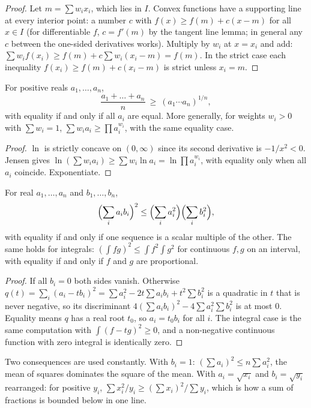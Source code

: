 \begin{proof}
Let $m=\sum w_ix_i$, which lies in $I$. Convex functions have a supporting line at every interior point: a number $c$ with $f(x)\ge f(m)+c(x-m)$ for all $x\in I$ (for differentiable $f$, $c=f'(m)$ by the tangent line lemma; in general any $c$ between the one-sided derivatives works). Multiply by $w_i$ at $x=x_i$ and add: $\sum w_if(x_i)\ge f(m)+c\sum w_i(x_i-m)=f(m)$. In the strict case each inequality $f(x_i)\ge f(m)+c(x_i-m)$ is strict unless $x_i=m$.
\end{proof}

\begin{theorem}
For positive reals $a_1,\dots,a_n$,
\[
\frac{a_1+\dots+a_n}{n}\ \ge\ (a_1\cdots a_n)^{1/n},
\]
with equality if and only if all $a_i$ are equal. More generally, for weights $w_i>0$ with $\sum w_i=1$, $\sum w_ia_i\ge\prod a_i^{w_i}$, with the same equality case.
\end{theorem}

\begin{proof}
$\ln$ is strictly concave on $(0,\infty)$ since its second derivative is $-1/x^2<0$. Jensen gives $\ln(\sum w_ia_i)\ge\sum w_i\ln a_i=\ln\prod a_i^{w_i}$, with equality only when all $a_i$ coincide. Exponentiate.
\end{proof}

\begin{theorem}
For real $a_1,\dots,a_n$ and $b_1,\dots,b_n$,
\[
\Bigl(\sum_i a_ib_i\Bigr)^2\le\Bigl(\sum_i a_i^2\Bigr)\Bigl(\sum_i b_i^2\Bigr),
\]
with equality if and only if one sequence is a scalar multiple of the other. The same holds for integrals: $(\int fg)^2\le\int f^2\int g^2$ for continuous $f,g$ on an interval, with equality if and only if $f$ and $g$ are proportional.
\end{theorem}

\begin{proof}
If all $b_i=0$ both sides vanish. Otherwise $q(t)=\sum_i(a_i-tb_i)^2=\sum a_i^2-2t\sum a_ib_i+t^2\sum b_i^2$ is a quadratic in $t$ that is never negative, so its discriminant $4(\sum a_ib_i)^2-4\sum a_i^2\sum b_i^2$ is at most $0$. Equality means $q$ has a real root $t_0$, so $a_i=t_0b_i$ for all $i$. The integral case is the same computation with $\int(f-tg)^2\ge 0$, and a non-negative continuous function with zero integral is identically zero.
\end{proof}

Two consequences are used constantly. With $b_i=1$: $(\sum a_i)^2\le n\sum a_i^2$, the mean of squares dominates the square of the mean. With $a_i=\sqrt{x_i}$ and $b_i=\sqrt{y_i}$ rearranged: for positive $y_i$, $\sum x_i^2/y_i\ge(\sum x_i)^2/\sum y_i$, which is how a sum of fractions is bounded below in one line.

